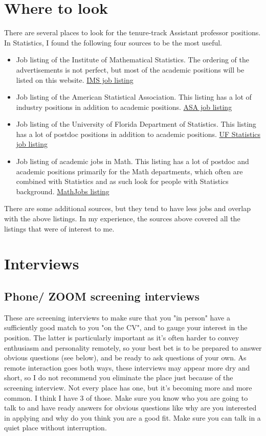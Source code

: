 \documentclass{article}
\begin{document}
\section{Where to look}
There are several places to look for the tenure-track Assistant professor positions. In Statistics, I found the following four sources to be the most useful.
\begin{itemize}
\item Job listing of the Institute of Mathematical Statistics. The ordering of the advertisements is not perfect, but most of the academic positions will be listed on this website.
\href{http://jobs.imstat.org/home/index.cfm?site_id=1847}{IMS job listing}

\item Job listing of the American Statistical Association. This listing has a lot of industry positions in addition to academic positions. \href{http://jobs.amstat.org/jobseekers/}{ASA job listing}

\item Job listing of the University of Florida Department of Statistics. This listing has a lot of postdoc positions in addition to academic positions. \href{http://www.stat.ufl.edu/jobs/}{UF Statistics job listing}

\item Job listing of academic jobs in Math. This listing has a lot of postdoc and academic positions primarily for the Math departments, which often are combined with Statistics and as such look for people with Statistics background.
\href{https://www.mathjobs.org/jobs}{MathJobs listing}
\end{itemize}
There are some additional sources, but they tend to have less jobs and overlap with the above listings. In my experience, the sources above covered all the listings that were of interest to me.

\section{Interviews}

\subsection{Phone/{\color{red} ZOOM} screening interviews}
{\color{red} These are screening interviews to make sure that you "in person" have a sufficiently good match to you "on the CV", and to gauge your interest in the position. The latter is particularly important as it's often harder to convey enthusiasm and personality remotely, so your best bet is to be prepared to answer obvious questions (see below), and be ready to ask questions of your own. As remote interaction goes both ways, these interviews may appear more dry and short, so I do not recommend you eliminate the place just because of the screening interview.}
Not every place has one, but it's becoming more and more common. I think I have 3 of those. Make sure you know who you are going to talk to and have ready answers for obvious questions like why are you interested in applying and why do you think you are a good fit. Make sure you can talk in a quiet place without interruption.
\end{document}
